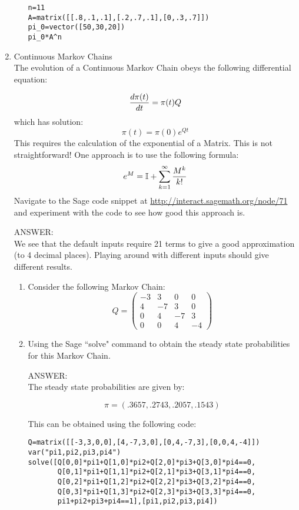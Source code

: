 \documentclass[12pt]{article}
\begin{document}
\begin{enumerate}
\begin{enumerate}
\begin{verbatim}
n=11
A=matrix([[.8,.1,.1],[.2,.7,.1],[0,.3,.7]])
pi_0=vector([50,30,20])
pi_0*A^n
\end{verbatim}

\end{enumerate}
\item Continuous Markov Chains\\
The evolution of a Continuous Markov Chain obeys the following differential equation:

$${d\pi(t)\over dt}=\pi(t)Q$$
which has solution:
$$\pi(t)=\pi(0)e^{Qt}$$
This requires the calculation of the exponential of a Matrix. This is not straightforward! One approach is to use the following formula:
$$
e^{M}=\mathbb{I}+\sum_{k=1}^{\infty}{M^k\over k!}
$$
Navigate to the Sage code snippet at \url{http://interact.sagemath.org/node/71} and experiment with the code to see how good this approach is.

ANSWER:\\
We see that the default inputs require 21 terms to give a good approximation (to 4 decimal places). Playing around with different inputs should give different results.

\begin{enumerate}
\item Consider the following Markov Chain:
$$Q=\begin{pmatrix}
-3&3&0&0\\
4&-7&3&0\\
0&4&-7&3\\
0&0&4&-4
\end{pmatrix}$$
\item Using the Sage ``solve" command to obtain the steady state probabilities for this Markov Chain.

ANSWER:\\
The steady state probabilities are given by:

$$\pi=(.3657,.2743,.2057,.1543)$$

This can be obtained using the following code:

\begin{verbatim}
Q=matrix([[-3,3,0,0],[4,-7,3,0],[0,4,-7,3],[0,0,4,-4]])
var("pi1,pi2,pi3,pi4")
solve([Q[0,0]*pi1+Q[1,0]*pi2+Q[2,0]*pi3+Q[3,0]*pi4==0,
       Q[0,1]*pi1+Q[1,1]*pi2+Q[2,1]*pi3+Q[3,1]*pi4==0,
       Q[0,2]*pi1+Q[1,2]*pi2+Q[2,2]*pi3+Q[3,2]*pi4==0,
       Q[0,3]*pi1+Q[1,3]*pi2+Q[2,3]*pi3+Q[3,3]*pi4==0,
       pi1+pi2+pi3+pi4==1],[pi1,pi2,pi3,pi4])
\end{verbatim}
\end{enumerate}
\end{enumerate}
\end{document}
